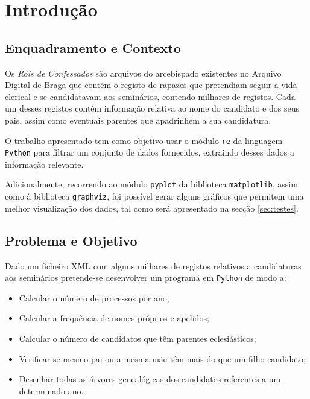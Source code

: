 \documentclass[a4paper, 11pt]{article}
\begin{document}
\pagebreak

\tableofcontents

\listoffigures

\pagebreak


\pagestyle{fancy}
\fancyhf{}


\renewcommand{\headrulewidth}{0pt}

\section{Introdução}
\label{sec:introducao}

\subsection{Enquadramento e Contexto}

Os \textit{Róis de Confessados} são arquivos do arcebispado existentes no Arquivo Digital de Braga que
contém o registo de rapazes que pretendiam seguir a vida clerical e se candidatavam aos seminários,
contendo milhares de registos. Cada um desses registos contém informação relativa ao nome do candidato
e dos seus pais, assim como eventuais parentes que apadrinhem a sua candidatura.

O trabalho apresentado tem como objetivo usar o módulo \texttt{re} da linguagem \texttt{Python} para
filtrar um conjunto de dados fornecidos, extraindo desses dados a informação relevante.

Adicionalmente, recorrendo ao módulo \texttt{pyplot} da biblioteca \texttt{matplotlib}, assim como à
biblioteca \texttt{graphviz}, foi possível gerar alguns gráficos que permitem uma melhor visualização
dos dados, tal como será apresentado na secção \ref{sec:testes}.

\subsection{Problema e Objetivo}

Dado um ficheiro XML com alguns milhares de registos relativos a candidaturas aos seminários
pretende-se desenvolver um programa em \texttt{Python} de modo a:

\begin{itemize}
    \item Calcular o número de processos por ano;
    \item Calcular a frequência de nomes próprios e apelidos;
    \item Calcular o número de candidatos que têm parentes eclesiásticos;
    \item Verificar se mesmo pai ou a mesma mãe têm mais do que um filho candidato;
    \item Desenhar todas as árvores genealógicas dos candidatos referentes a um determinado ano.
\end{itemize}
\end{document}
